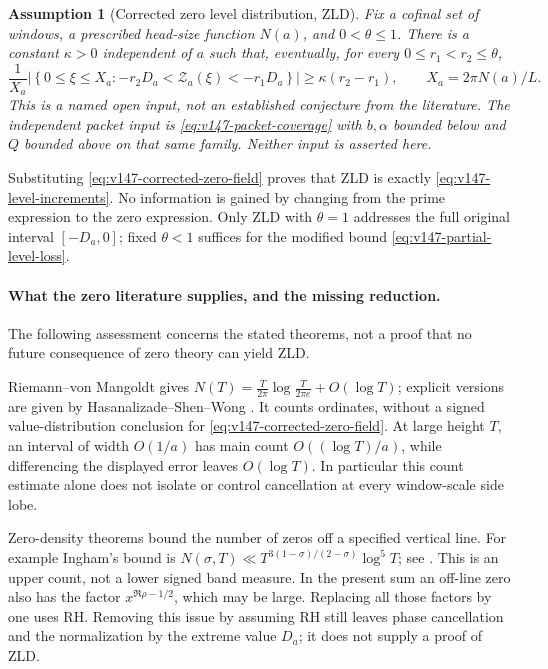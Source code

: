 \documentclass[11pt]{article}
\newtheorem{assumption}[theorem]{Assumption}
\theoremstyle{remark}
\begin{document}
\begin{assumption}[Corrected zero level distribution, ZLD]
\label{ass:v147-zld}
Fix a cofinal set of windows, a prescribed head-size function $N(a)$,
and $0<\theta\le1$. There is a constant $\kappa>0$ independent of
$a$ such that, eventually, for every $0\le r_1<r_2\le\theta$,
\begin{equation}\label{eq:v147-zld}
 \frac1{X_a}\left|\left\{0\le\xi\le X_a:
  -r_2D_a<\mathcal Z_a(\xi)<-r_1D_a\right\}\right|
 \ge\kappa(r_2-r_1),\qquad X_a=2\pi N(a)/L.
\end{equation}
This is a named \emph{open input}, not an established conjecture from
the literature. The independent packet input is
\eqref{eq:v147-packet-coverage} with $b,\alpha$ bounded below and
$Q$ bounded above on that same family. Neither input is asserted here.
\end{assumption}
Substituting \eqref{eq:v147-corrected-zero-field} proves that ZLD is
exactly \eqref{eq:v147-level-increments}. No information is gained by
changing from the prime expression to the zero expression. Only ZLD
with $\theta=1$ addresses the full original interval $[-D_a,0]$;
fixed $\theta<1$ suffices for the modified bound
\eqref{eq:v147-partial-level-loss}.

\paragraph{What the zero literature supplies, and the missing reduction.}
The following assessment concerns the stated theorems, not a proof
that no future consequence of zero theory can yield ZLD.

Riemann--von Mangoldt gives
$N(T)=\frac{T}{2\pi}\log\frac{T}{2\pi e}+O(\log T)$; explicit
versions are given by Hasanalizade--Shen--Wong
\cite{HasanalizadeShenWong2022}. It counts ordinates, without a signed
value-distribution conclusion for \eqref{eq:v147-corrected-zero-field}.
At large height $T$, an interval of width $O(1/a)$ has main count
$O((\log T)/a)$, while differencing the displayed error leaves
$O(\log T)$. In particular this count estimate alone does not isolate
or control cancellation at every window-scale side lobe.

Zero-density theorems bound the number of zeros off a specified
vertical line. For example Ingham's bound is
$N(\sigma,T)\ll T^{3(1-\sigma)/(2-\sigma)}\log^5T$; see
\cite{Ingham1940,ChourasiyaSimonic2025}. This is an upper count,
not a lower signed band measure. In the present sum an off-line zero
also has the factor $x^{\Re\rho-1/2}$, which may be large. Replacing
all those factors by one uses RH. Removing this issue by assuming RH
still leaves phase cancellation and the normalization by the extreme
value $D_a$; it does not supply a proof of ZLD.
\end{document}
